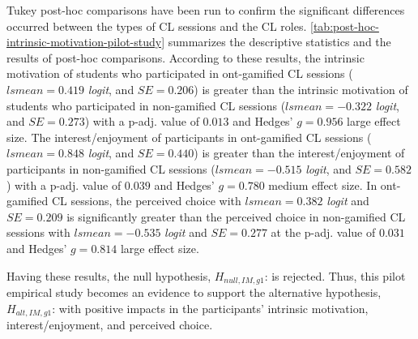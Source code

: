 Tukey post-hoc comparisons have been run to confirm the significant differences occurred between the types of CL sessions and the CL roles. \autoref{tab:post-hoc-intrinsic-motivation-pilot-study} summarizes the descriptive statistics and the results of post-hoc comparisons. According to these results, the intrinsic motivation of students who participated in ont-gamified CL sessions ($lsmean = 0.419$ \emph{logit}, and $SE = 0.206$) is greater than the intrinsic motivation of students who participated in non-gamified CL sessions ($lsmean = -0.322$ \emph{logit}, and $SE = 0.273$) with a p-adj. value of $0.013$ and Hedges' $g=0.956$ large effect size. The interest/enjoyment of participants in ont-gamified CL sessions ($lsmean = 0.848$ \emph{logit}, and $SE = 0.440$) is greater than the interest/enjoyment of participants in non-gamified CL sessions ($lsmean = -0.515$ \emph{logit}, and $SE = 0.582$) with a p-adj. value of $0.039$ and Hedges' $g=0.780$ medium effect size. In ont-gamified CL sessions, the perceived choice with $lsmean = 0.382$ \emph{logit} and $SE = 0.209$ is significantly greater than the perceived choice in non-gamified CL sessions with $lsmean = -0.535$ \emph{logit} and $SE = 0.277$ at the p-adj. value of $0.031$ and Hedges' $g = 0.814$ large effect size.

Having these results, the null hypothesis, $H_{null,IM,g1}$:  is rejected. Thus, this pilot empirical study becomes an evidence to support the alternative hypothesis, $H_{alt,IM,g1}$:  with positive impacts in the participants' intrinsic motivation, interest/enjoyment, and perceived choice.

